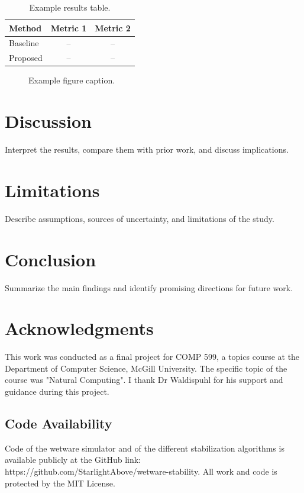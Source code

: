 \documentclass[11pt,a4paper]{article}
\begin{document}
\begin{table}[ht]
	\centering
	\caption{Example results table.}
	\label{tab:results}
	\begin{tabular}{lcc}
		\toprule
		Method & Metric 1 & Metric 2 \\
		\midrule
		Baseline & -- & -- \\
		Proposed & -- & -- \\
		\bottomrule
	\end{tabular}
\end{table}

\begin{figure}[ht]
	\centering
	\caption{Example figure caption.}
	\label{fig:example}
\end{figure}

\section{Discussion}
Interpret the results, compare them with prior work, and discuss implications.

\section{Limitations}
Describe assumptions, sources of uncertainty, and limitations of the study.

\section{Conclusion}
Summarize the main findings and identify promising directions for future work.

\section*{Acknowledgments}
This work was conducted as a final project for COMP 599, a topics course at the Department of Computer Science, McGill University. The specific topic of the course was 
"Natural Computing". I thank Dr Waldispuhl for his support and guidance during this project. 

\subsection*{Code Availability}
Code of the wetware simulator and of the different stabilization algorithms is available publicly at the GitHub link: https://github.com/StarlightAbove/wetware-stability. All work and code is protected by
the MIT License.
\end{document}
